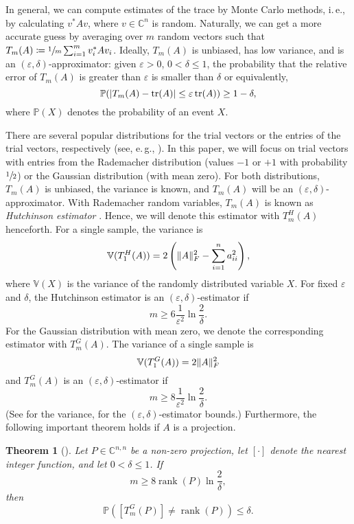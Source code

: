 \documentclass[%
	paper=a4,
	fontsize=10pt,
	DIV11,BCOR10mm,
	numbers=noenddot,
	abstract=yes
]{scrartcl}
\newcommand{\F}{\mathbb{C}}
\DeclarePairedDelimiter\abs{\lvert}{\rvert}
\DeclarePairedDelimiter\norm{\lVert}{\rVert}
\DeclareMathOperator{\rank}{rank}
\newtheorem{theorem}{Theorem}[section]
\theoremstyle{definition}
\begin{document}
In general, we can compute estimates of the trace by Monte Carlo methods,
i.\,e., by calculating $v^* A v$, where $v \in \F^n$ is random. Naturally, we
can get a more accurate guess by averaging over $m$ random vectors such that
$T_m(A) \coloneqq \sfrac{1}{m} \sum_{i=1}^m v_i^* A v_i$. Ideally, $T_m(A)$ is
unbiased, has low variance, and is an $(\varepsilon, \delta)$-approximator:
given $\varepsilon > 0$, $0 < \delta \leq 1$, the probability that the relative
error of $T_m(A)$ is greater than $\varepsilon$ is smaller than $\delta$ or
equivalently,
\[
	\mathbb{P}(
		\abs{T_m(A) - \operatorname{tr}(A)} \leq
		\varepsilon \operatorname{tr}(A) )
	\geq 1 - \delta,
\]
where $\mathbb{P}(X)$ denotes the probability of an event $X$.

There are several popular distributions for the trial vectors or the entries of
the trial vectors, respectively (see, e.\,g., \cite[§3]{Avron2011}). In this
paper, we will focus on trial vectors with entries from the Rademacher
distribution (values $-1$ or $+1$ with probability $\sfrac{1}{2}$) or the
Gaussian distribution (with mean zero). For both distributions, $T_m(A)$ is
unbiased, the variance is known, and $T_m(A)$ will be an $(\varepsilon,
\delta)$-approximator. With Rademacher random variables, $T_m(A)$ is known as
\emph{Hutchinson estimator} \cite{Hutchinson1990}. Hence, we will denote this
estimator with $T_m^H(A)$ henceforth. For a single sample, the variance is
\[
	\mathbb{V}(T_1^H(A)) =
	2 \left( \norm{A}_F^2 - \sum_{i=1}^n a_{ii}^2 \right),
\]
where $\mathbb{V}(X)$ is the variance of the randomly distributed variable $X$.
For fixed $\varepsilon$ and $\delta$, the Hutchinson estimator is an
$(\varepsilon, \delta)$-estimator if
\[ m \geq 6 \frac{1}{\varepsilon^2} \ln \frac{2}{\delta}. \]
For the Gaussian distribution with mean zero, we denote the corresponding
estimator with $T_m^G(A)$. The variance of a single sample is
\[ \mathbb{V}(T_1^G(A)) = 2 \norm{A}_F^2 \]
and $T_m^G(A)$ is an $(\varepsilon, \delta)$-estimator if
\[ m \geq 8 \frac{1}{\varepsilon^2} \ln \frac{2}{\delta}. \]
(See \cite[Table~1]{Avron2011} for the variance, \cite{Roosta-Khorasani2015} for
the $(\varepsilon, \delta)$-estimator bounds.)
Furthermore, the following important theorem holds if $A$ is a projection.

\begin{theorem}[{\cite[Corollary~4]{Roosta-Khorasani2015}}]
	Let $P \in \F^{n,n}$ be a non-zero projection, let $[\cdot]$ denote the
	nearest integer function, and let $0 < \delta \leq 1$. If
	\[ m \geq 8 \rank(P) \ln \frac{2}{\delta}, \]
	then
	\[ \mathbb{P}\left( [T_m^G(P)] \neq \rank(P) \right) \leq \delta. \]
\end{theorem}
\end{document}
